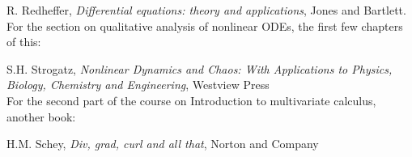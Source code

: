 \documentclass[twoside]{scrartcl}
\begin{document}
{{R. Redheffer, \emph{Differential equations: theory and applications}, Jones and Bartlett.\\


For the section on qualitative analysis of nonlinear ODEs, the first few chapters of this:


S.H. Strogatz, \emph{Nonlinear Dynamics and Chaos: With Applications to Physics, Biology, Chemistry and Engineering}, Westview Press\\


For the second part of the course on Introduction to multivariate calculus, another book:

H.M. Schey, \emph{Div, grad, curl and all that}, Norton and Company
}}

\TableofContents

		
	
\end{document}
